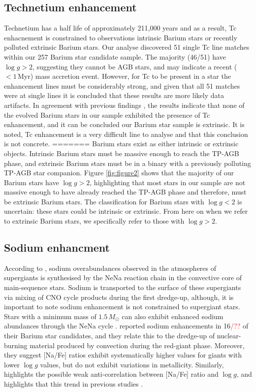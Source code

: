 \documentclass[a4paper,fleqn,usenatbib]{mnras}
\newcommand{\todo}[1]{\textcolor{red}{#1}}
\begin{document}
\subsection{Technetium enhancement}

Technetium has a half life of approximately 211,000 years and as a result, Tc enhacnement is constrained to observations intrinsic Barium stars \citep{jorissen1993} or recently polluted extrinsic Barium stars. Our analyse discovered 51 single Tc line matches within our 257 Barium star candidate sample. The majority (46/51) have $\log{g} > 2$, suggesting they cannot be AGB stars, and may indicate a recent ($<1\,\textrm{Myr}$) mass accretion event. However, for Tc to be present in  a star the enhancement lines must be considerably strong, and given that all 51 matches were at single lines it is concluded that these results are more likely data artifacts. In agreement with previous findings \citep[e.g.][]{little1987,smith1984,smith1983}, the results indicate that none of the evolved Barium stars in our sample exhibited the presence of Tc enhancement, and it can be concluded our Barium star sample is extrinsic. It is noted, Tc enhancement is a very difficult line to analyse and that this conclusion is not concrete.
=======
Barium stars exist as either intrinsic or extrinsic objects. Intrinsic Barium stars must be massive enough to reach the TP-AGB phase, and extrinsic Barium stars must be in a binary with a previously polluting TP-AGB star companion. Figure \ref{fig:figure2} shows that the majority of our Barium stars have $\log{g} > 2$, highlighting that most stars in our sample are not massive enough to have already reached the TP-AGB phase and therefore, must be extrinsic Barium stars. The classification for Barium stars with $\log{g} < 2$ is uncertain: these stars could be intrinsic or extrinsic. From here on when we refer to extrinsic Barium stars, we specifically refer to those with $\log{g} > 2$.


\subsection{Sodium enhancment}
According to \citet{el1995}, sodium overabundances observed in the atmospheres of supergiants is synthesised by the NeNa reaction chain in the convective core of main-sequence stars. Sodium is transported to the surface of these supergiants via mixing of CNO cycle products during the first dredge-up, although, it is important to note sodium enhancement is not constrained to supergiant stars. Stars with a  minimum mass of $1.5\,M_\odot$ can also exhibit enhanced sodium abundances through the NeNa cycle \citep{denissenkov1987}. \citet{antipova2004} reported sodium enhancements in 16\todo{/??} of their Barium star candidates, and they relate this to the dredge-up of nuclear-burning material produced by convection during the red-giant phase. Moreover, they suggest [Na/Fe] ratios exhibit systematically higher values for giants with lower $\log{g}$ values, but do not exhibit variations in metallicity. Similarly, \citet{decastro2016} highlights the possible weak anti-correlation between [Na/Fe] ratio and $\log{g}$, and highlights that this trend in previous studies \citep[e.g.][]{boyarchuk2002,mishenina2006,luck2007,takeda2008}.
\end{document}
